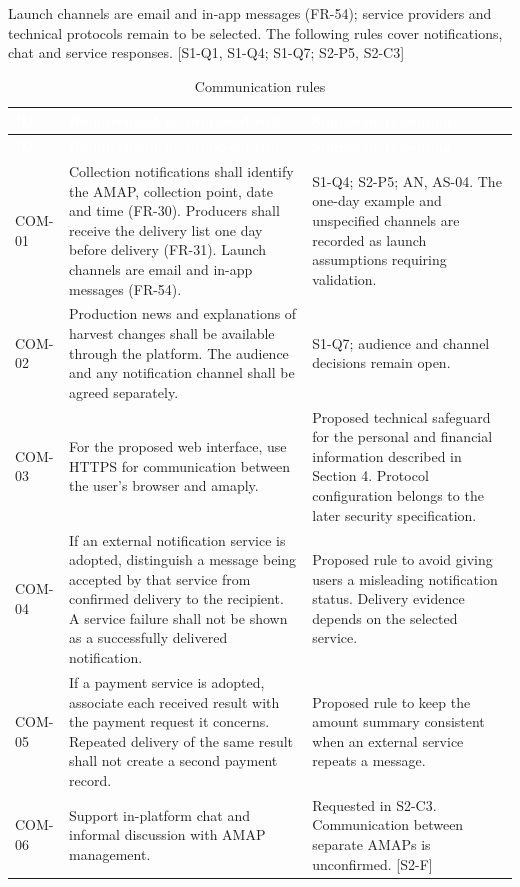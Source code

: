 \documentclass[11pt,a4paper]{article}
\begin{document}
Launch channels are email and in-app messages (FR-54); service providers and technical protocols remain to be selected. The following rules cover notifications, chat and service responses. [S1-Q1, S1-Q4; S1-Q7; S2-P5, S2-C3]

{\footnotesize
\begin{longtable}{>{\raggedright\arraybackslash\hspace{0pt}}p{}>{\raggedright\arraybackslash\hspace{0pt}}p{}>{\raggedright\arraybackslash\hspace{0pt}}p{}}
\caption{Communication rules}\\
\rowcolor{hdr}\textcolor{white}{\textbf{ID}} & \textcolor{white}{\textbf{Requirement or proposed rule}} & \textcolor{white}{\textbf{Source or reasoning}} \\ \endfirsthead
\rowcolor{hdr}\textcolor{white}{\textbf{ID}} & \textcolor{white}{\textbf{Requirement or proposed rule}} & \textcolor{white}{\textbf{Source or reasoning}} \\ \endhead
COM-01 & Collection notifications shall identify the AMAP, collection point, date and time (FR-30). Producers shall receive the delivery list one day before delivery (FR-31). Launch channels are email and in-app messages (FR-54). & S1-Q4; S2-P5; AN, AS-04. The one-day example and unspecified channels are recorded as launch assumptions requiring validation. \\ \hline
COM-02 & Production news and explanations of harvest changes shall be available through the platform. The audience and any notification channel shall be agreed separately. & S1-Q7; audience and channel decisions remain open. \\ \hline
COM-03 & For the proposed web interface, use HTTPS for communication between the user's browser and amaply. & Proposed technical safeguard for the personal and financial information described in Section 4. Protocol configuration belongs to the later security specification. \\ \hline
COM-04 & If an external notification service is adopted, distinguish a message being accepted by that service from confirmed delivery to the recipient. A service failure shall not be shown as a successfully delivered notification. & Proposed rule to avoid giving users a misleading notification status. Delivery evidence depends on the selected service. \\ \hline
COM-05 & If a payment service is adopted, associate each received result with the payment request it concerns. Repeated delivery of the same result shall not create a second payment record. & Proposed rule to keep the amount summary consistent when an external service repeats a message. \\ \hline
COM-06 & Support in-platform chat and informal discussion with AMAP management. & Requested in S2-C3. Communication between separate AMAPs is unconfirmed. [S2-F] \\ \hline
\end{longtable}}
\end{document}

